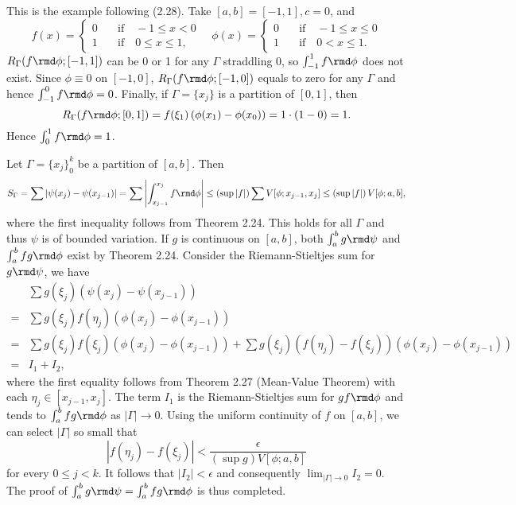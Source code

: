 \begin{exercise}{2.14}
  This is the example following (2.28).
  Take $[a,b] = [-1, 1], c=0$, and
  \[
    f(x) = \left\{
    \begin{aligned}
      0 & \quad \text{if} \quad -1 \le x < 0 \\
      1 & \quad \text{if} \quad 0 \le x \le 1,
    \end{aligned}
    \right.
    \quad
    \phi(x) = \left\{
    \begin{aligned}
      0 & \quad \text{if} \quad -1 \le x \le 0 \\
      1 & \quad \text{if} \quad 0 < x \le 1.
    \end{aligned}
    \right.
  \]
  $R_\Gamma(f\rmd \phi; [-1, 1])$ can be 0 or 1 for any $\Gamma$ straddling $0$,
  so $\int_{-1}^1 f\rmd \phi$ does not exist.
  Since $\phi \equiv 0$ on $[-1, 0]$,
  $R_\Gamma(f \rmd \phi; [-1, 0])$ equals to zero for any $\Gamma$
  and hence $\int_{-1}^0 f \rmd \phi = 0$.
  Finally, if $\Gamma = \{x_j\}$ is a partition of $[0, 1]$, then
  \[
    R_\Gamma(f \rmd \phi; [0, 1]) = f(\xi_1) \left( \phi(x_1) - \phi(x_0) \right)
    = 1 \cdot (1-0) = 1.
  \]
  Hence $\int_0^1 f \rmd \phi = 1$.
\end{exercise}

\begin{exercise}{2.15}
  Let $\Gamma = \{x_j\}_0^k$ be a partition of $[a,b]$. Then
  \[
    S_\Gamma = \sum \left\vert \psi(x_j) - \psi(x_{j-1}) \right\vert
    = \sum \left\vert \int_{x_{j-1}}^{x_j} f \rmd \phi \right\vert
    \le \left(\sup |f|\right) \sum V[\phi; x_{j-1}, x_j]
    \le \left(\sup |f|\right) V[\phi; a,b],
  \]
  where the first inequality follows from Theorem 2.24.
  This holds for all $\Gamma$ and thus $\psi$ is of bounded variation.
  If $g$ is continuous on $[a,b]$,
  both $\int_a^b g \rmd \psi$ and $\int_a^b fg \rmd \phi$ exist
  by Theorem 2.24.
  Consider the Riemann-Stieltjes sum for $g \rmd \psi$, we have
  \begin{align*}
    & \sum g(\xi_j) \left( \psi(x_j) - \psi(x_{j-1}) \right) \\
    = & \sum g(\xi_j) f(\eta_j) \left( \phi(x_j) - \phi(x_{j-1}) \right) \\
    = & \sum g(\xi_j) f(\xi_j) \left( \phi(x_j) - \phi(x_{j-1}) \right)
    + \sum g(\xi_j) \left( f(\eta_j) - f(\xi_j) \right)
    \left( \phi(x_j) - \phi(x_{j-1}) \right) \\
    = & I_1 + I_2,
  \end{align*}
  where the first equality follows from Theorem 2.27 (Mean-Value Theorem)
  with each $\eta_j \in [x_{j-1}, x_j]$.
  The term $I_1$ is the Riemann-Stieltjes sum for $gf \rmd \phi$
  and tends to $\int_a^b fg \rmd \phi$ as $|\Gamma| \rightarrow 0$.
  Using the uniform continuity of $f$ on $[a,b]$,
  we can select $|\Gamma|$ so small that
  \[
    \left\vert f(\eta_j) - f(\xi_j) \right\vert <
    \frac{\epsilon} {\left( \sup g \right) V[\phi; a,b]}
  \]
  for every $0 \le j < k$.
  It follows that $|I_2| < \epsilon$
  and consequently $\lim_{|\Gamma| \rightarrow 0} I_2 = 0$.
  The proof of $\int_a^b g \rmd \psi = \int_a^b fg \rmd \phi$ is thus completed.
\end{exercise}


